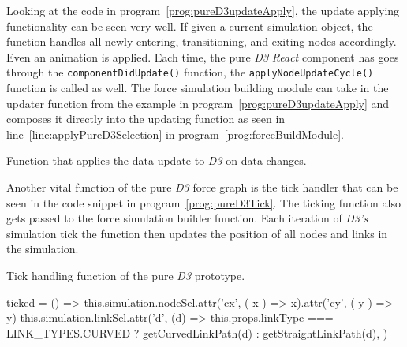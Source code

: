Looking at the code in program~\ref{prog:pureD3updateApply}, the update applying functionality can be seen very well. If given a current simulation object, the function handles all newly entering, transitioning, and exiting nodes accordingly. Even an animation is applied. Each time, the pure \emph{D3} \emph{React} component has goes through the \texttt{componentDidUpdate()} function, the \texttt{applyNodeUpdateCycle()} function is called as well. The force simulation building module can take in the updater function from the example in program~\ref{prog:pureD3updateApply} and composes it directly into the updating function as seen in line~\ref{line:applyPureD3Selection} in program~\ref{prog:forceBuildModule}.

\begin{program}[th]
\caption{Function that applies the data update to \emph{D3} on data changes.}
\label{prog:pureD3updateApply}
\end{program}

Another vital function of the pure \emph{D3} force graph is the tick handler that can be seen in the code snippet in program~\ref{prog:pureD3Tick}. The ticking function also gets passed to the force simulation builder function. Each iteration of \emph{D3's} simulation tick the function then updates the position of all nodes and links in the simulation.

\begin{program}[th]
\caption{Tick handling function of the pure \emph{D3} prototype.}
\label{prog:pureD3Tick}
\begin{JsCode}
ticked = () => {
  this.simulation.nodeSel.attr('cx', ({ x }) => x).attr('cy', ({ y }) => y)
  this.simulation.linkSel.attr('d', (d) =>
    this.props.linkType === LINK_TYPES.CURVED ? getCurvedLinkPath(d) : getStraightLinkPath(d),
  )
}
\end{JsCode}
\end{program}


